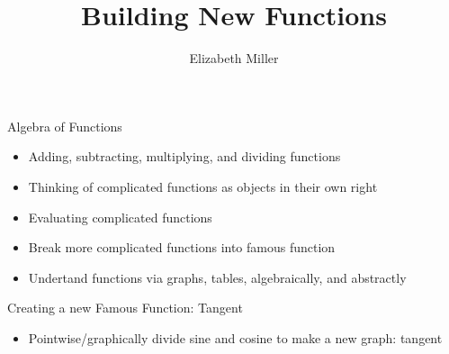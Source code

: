 \documentclass{ximera}
\author{Elizabeth Miller}
\title{Building New Functions}
\begin{document}
\begin{abstract}
\end{abstract}
\maketitle


\begin{objectives}

\item Algebra of Functions
\begin{itemize}
	\item Adding, subtracting, multiplying, and dividing functions 
	\item Thinking of complicated functions as objects in their own right 
	\item Evaluating complicated functions 
	\item Break more complicated functions into famous function %
	\item Undertand functions via graphs, tables, algebraically, and abstractly 
\end{itemize}


\item Creating a new Famous Function: Tangent
\begin{itemize}
	\item Pointwise/graphically divide sine and cosine to make a new graph: tangent
\end{itemize}

\end{objectives}
\end{document}
